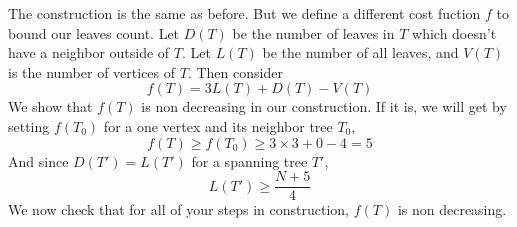 \begin{solution}
    The construction is the same as before. But we define a different cost
    fuction $f$ to bound our leaves count. Let $D(T)$ be the number of leaves in
    $T$ which doesn't have a neighbor outside of $T$. Let $L(T)$ be the number of
    all leaves, and $V(T)$ is the number of vertices of $T$. Then consider 
    \[\boxed{f(T) = 3L(T) + D(T) - V(T)}\] 
    We show that $f(T)$ is non decreasing in our construction. If it is, we
    will get by setting $f(T_0)$ for a one vertex and its neighbor tree $T_0$, 
    \[f(T) \ge f(T_0) \ge 3\times 3 +0 -4 = 5 \] 
    And since $D(T') = L(T')$ for a spanning tree $T'$, \[L(T') \ge \frac{N+5}{4}\] 
    We now check that for all of your steps in construction, $f(T)$ is non
    decreasing.
\end{solution}



\label{problem:divide_and_conquer_4}\label{problem:induction_type1_10}



